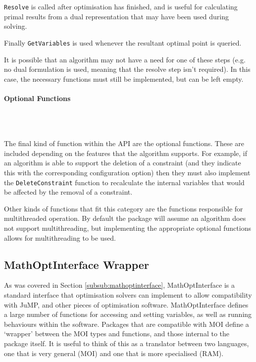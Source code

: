 \texttt{Resolve} is called after optimisation has finished, and is useful for calculating primal results from a dual representation that may have been used during solving. 

Finally \texttt{GetVariables} is used whenever the resultant optimal point is queried.

It is possible that an algorithm may not have a need for one of these steps (e.g. no dual formulation is used, meaning that the resolve step isn't required). In this case, the necessary functions must still be implemented, but can be left empty.

%    

\paragraph{Optional Functions}\\\

The final kind of function within the API are the optional functions. These are included depending on the features that the algorithm supports. For example, if an algorithm is able to support the deletion of a constraint (and they indicate this with the corresponding configuration option) then they must also implement the \texttt{DeleteConstraint} function to recalculate the internal variables that would be affected by the removal of a constraint.

Other kinds of functions that fit this category are the functions responsible for multithreaded operation. By default the package will assume an algorithm  does not support multithreading, but implementing the appropriate optional functions allows for multithreading to be used.

\subsection{MathOptInterface Wrapper}\label{sub:moi_wrapper}
As was covered in Section \ref{subsub:mathoptinterface}, MathOptInterface is a standard interface that optimisation solvers can implement to allow compatibility with JuMP, and other pieces of optimisation software. MathOptInterface defines a large number of functions for accessing and setting variables, as well as running behaviours within the software. Packages that are compatible with MOI define a `wrapper' between the MOI types and functions, and those internal to the package itself. It is useful to think of this as a translator between two languages, one that is very general (MOI) and one that is more specialised (RAM). 

